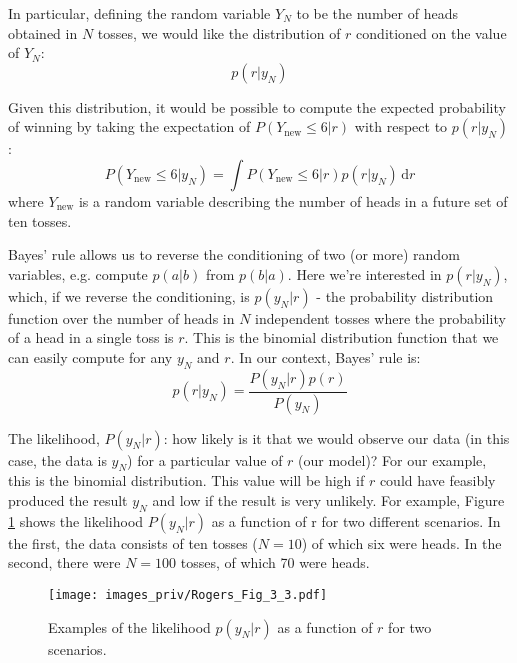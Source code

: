 In particular, defining the random variable $Y_N$ to be the number of heads
obtained in $N$ tosses, we would like the distribution of $r$ conditioned on the value of
$Y_{N}$:
\begin{equation*}
p(r|y_{N})
\end{equation*}

Given this distribution, it would be possible to compute the expected probability of
winning by taking the expectation of $P(Y_{\mathrm{new}} \leq 6|r)$ with respect
to $p(r|y_{N})$:
\begin{equation*}
P(Y_{\mathrm{new}} \leq 6 | y_{N}) = \int P(Y_{\mathrm{new}} \leq 6|r) p(r|y_{N}) \, \mathrm{d}r
\end{equation*}
where $Y_{\mathrm{new}}$ is a random variable describing the number of heads in a future set of
ten tosses.

Bayes' rule allows us
to reverse the conditioning of two (or more) random variables, e.g. compute $p(a|b)$
from $p(b|a)$. Here we're interested in $p(r|y_N)$, which, if we reverse the conditioning,
is $p(y_N|r)$ - the probability distribution function over the number of heads in $N$
independent tosses where the probability of a head in a single toss is $r$. This is the
binomial distribution function that we can easily compute for any $y_N$ and $r$. In our
context, Bayes' rule is:
\begin{equation}
p(r|y_{N}) = \frac{P(y_N|r) p(r)}{P(y_N)}
\label{eq:bayes33}
\end{equation}

The likelihood, $P(y_N|r)$: how likely is it that we would observe our data (in this
case, the data is $y_N$) for a particular value of $r$ (our model)?
For our example, this is
the binomial distribution. This value will be high if $r$ could have feasibly produced
the result $y_N$ and low if the result is very unlikely. For example, Figure \ref{fig:Rogers_3_3}
shows
the likelihood $P(y_N|r)$ as a function of r for two different scenarios. In the first, the
data consists of ten tosses ($N = 10$) of which six were heads. In the second, there
were $N = 100$ tosses, of which 70 were heads.

\begin{figure}[h]
{\centering
\texttt{[image: images\_priv/Rogers\_Fig\_3\_3.pdf]}
\par}
\caption{Examples of the likelihood $p(y_N|r)$ as a function of $r$ for
two scenarios.}
\label{fig:Rogers_3_3}
\end{figure}


